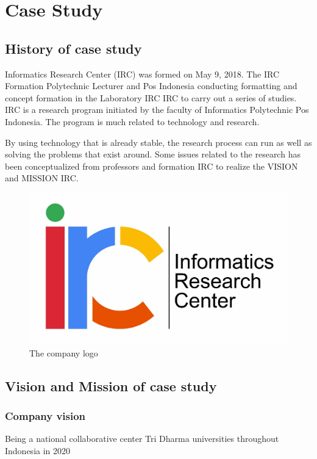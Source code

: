 \chapter{Case Study}

\section{History of case study}
Informatics Research Center (IRC) was formed on May 9, 2018. The IRC Formation Polytechnic Lecturer and Pos Indonesia conducting formatting and concept formation in the Laboratory IRC IRC to carry out a series of studies. IRC is a research program initiated by the faculty of Informatics Polytechnic Pos Indonesia. The program is much related to technology and research.
\par
By using technology that is already stable, the research process can run as well as solving the problems that exist around. Some issues related to the research has been conceptualized from professors and formation IRC to realize the VISION and MISSION IRC.


\begin{figure}[h!]
\centering
\includegraphics[scale=0.1]{figures/irc.jpeg}
\caption{The company logo}
\label{labelgambar2}
\end{figure}

\section{Vision and Mission of case study}
\subsection{Company vision}
Being a national collaborative center Tri Dharma universities throughout Indonesia in 2020

